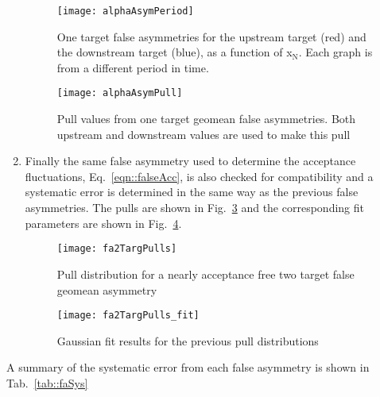 \begin{enumerate}
  \begin{figure}[h!t]
    \centering
    \texttt{[image: alphaAsymPeriod]}
    \caption{One target false asymmetries for the upstream target (red) and the
      downstream target (blue), as a function of x$_{\mathrm{N}}$.  Each graph
      is from a different period in time.}
    \label{fig::alphaAsymPeriod}
  \end{figure}

  \begin{figure}[h!t]
    \centering
    \texttt{[image: alphaAsymPull]}
    \caption{Pull values from one target geomean false asymmetries.  Both
      upstream and downstream values are used to make this pull}
    \label{fig::alphaAsymPull}
  \end{figure}

\item Finally the same false asymmetry used to determine the acceptance
  fluctuations, Eq.~\ref{eqn::falseAcc}, is also checked for compatibility and a
  systematic error is determined in the same way as the previous false
  asymmetries.  The pulls are shown in Fig.~\ref{fig::fa2TargPulls} and the
  corresponding fit parameters are shown in Fig.~\ref{fig::fa2TargPulls_fit}.

  \begin{figure}[h!t]
    \centering
    \texttt{[image: fa2TargPulls]}
    \caption{Pull distribution for a nearly acceptance free two target false
      geomean asymmetry}
    \label{fig::fa2TargPulls}
  \end{figure}
  
  \begin{figure}[h!t]
    \centering
    \texttt{[image: fa2TargPulls\_fit]}
    \caption{Gaussian fit results for the previous pull
      distributions}
    \label{fig::fa2TargPulls_fit}
  \end{figure}
  
\end{enumerate}

A summary of the systematic error from each false asymmetry is shown in
Tab.~\ref{tab::faSys}

